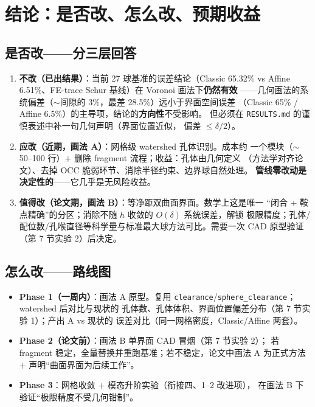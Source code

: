 \documentclass[11pt]{ctexart}
\begin{document}
\section{结论：是否改、怎么改、预期收益}

\subsection{是否改——分三层回答}

\begin{enumerate}
  \item \textbf{不改（已出结果）}：当前 27 球基准的误差结论（Classic 65.32\%
  vs Affine 6.51\%、FE-trace Schur 基线）在 Voronoi 画法下\textbf{仍然有效}
  ——几何画法的系统偏差（$\sim$间隙的 3\%，最差 28.5\%）远小于界面空间误差
  （Classic 65\% / Affine 6.5\%）的主导项，结论的\textbf{方向性}不受影响。
  但必须在 \texttt{RESULTS.md} 的谨慎表述中补一句几何声明（界面位置近似，
  偏差 $\le \delta/2$）。

  \item \textbf{应改（近期，画法 A）}：网格级 watershed 孔体识别。成本约
  一个模块（$\sim$50--100 行）+ 删除 fragment 流程；收益：孔体由几何定义
  （方法学对齐论文）、去掉 OCC 脆弱环节、消除半径约束、边界球自然处理。
  \textbf{管线零改动是决定性的}——它几乎是无风险收益。

  \item \textbf{值得改（论文期，画法 B）}：等净距双曲面界面。数学上这是唯一
  ``闭合 + 鞍点精确''的分区；消除不随 $h$ 收敛的 $O(\delta)$ 系统误差，解锁
  极限精度；孔体/配位数/孔喉直径等科学量与标准最大球方法可比。需要一次
  CAD 原型验证（第 7 节实验 2）后决定。
\end{enumerate}

\subsection{怎么改——路线图}

\begin{itemize}
  \item \textbf{Phase 1（一周内）}：画法 A 原型。复用
  \texttt{clearance}/\texttt{sphere\_clearance}；watershed 后对比与现状的
  孔体数、孔体体积、界面位置偏差分布（第 7 节实验 1）；产出 A vs 现状的
  误差对比（同一网格密度，Classic/Affine 两套）。
  \item \textbf{Phase 2（论文前）}：画法 B 单界面 CAD 冒烟（第 7 节实验 2）；
  若 fragment 稳定，全量替换并重跑基准；若不稳定，论文中画法 A 为正式方法
  + 声明``曲面界面为后续工作''。
  \item \textbf{Phase 3}：网格收敛 + 模态升阶实验（衔接四、1--2 改进项），
  在画法 B 下验证``极限精度不受几何钳制''。
\end{itemize}
\end{document}
